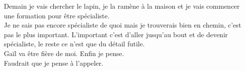 Demain je vais chercher le lapin, je la ramène à la maison et je vais commencer une formation pour être spécialiste. \\
Je ne sais pas encore spécialiste de quoi mais je trouverais bien en chemin, c'est pas le plus important. L'important c'est d'aller jusqu'au bout et de devenir spécialiste, le reste ce n'est que du détail futile.\\

Gaïl va être fière de moi. Enfin je pense. \\

Faudrait que je pense à l’appeler.